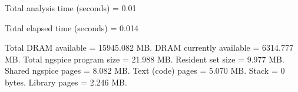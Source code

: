 Total analysis time (seconds) = 0.01

Total elapsed time (seconds) = 0.014 

Total DRAM available = 15945.082 MB.
DRAM currently available = 6314.777 MB.
Total ngspice program size =   21.988 MB.
Resident set size =    9.977 MB.
Shared ngspice pages =    8.082 MB.
Text (code) pages =    5.070 MB.
Stack = 0 bytes.
Library pages =    2.246 MB.

